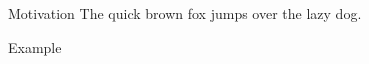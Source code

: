 \begin{block}{Motivation}
\small\alert{The quick brown fox jumps over the lazy dog.}
\blindtext
\end{block}

\vspace{1ex}

\begin{block}{Example}
\small\blinditemize
\end{block}
